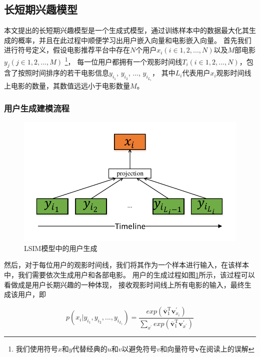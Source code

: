 \subsection{长短期兴趣模型}
本文提出的长短期兴趣模型是一个生成式模型，通过训练样本中的数据最大化其生成的概率，并且在此过程中顺便学习出用户嵌入向量和电影嵌入向量。
首先我们进行符号定义，假设电影推荐平台中存在$N$个用户$x_i(i \in 1,2,...,N)$以及$M$部电影$y_j(j \in 1,2,...,M)$
\footnote{我们使用符号$x$和$y$代替经典的$u$和$v$以避免符号$v$和向量符号$\mathbf{v}$在阅读上的误解}，
每一位用户都拥有一个观影时间线$T_i(i \in 1,2,...,N)$，包含了按照时间排序的若干电影信息$y_{i_1}$, $y_{i_2}$, ..., $y_{i_{L_i}}$，
其中$L_i$代表用户$x_i$观影时间线上电影的数量，其数值远远小于电影数量$M$。

\subsubsection{用户生成建模流程}
\begin{figure}[htbp]
    \centering
    \includegraphics[scale=0.6]{images/doc2vec1.pdf}
    \caption{LSIM模型中的用户生成}
    \label{fig:doc2vec1}
\end{figure}

然后，对于每位用户的观影时间线，我们将其作为一个样本进行输入，在该样本中，我们需要依次生成用户和各部电影。
用户的生成过程如图\ref{fig:doc2vec1}所示，该过程可以看做成是用户长期兴趣的一种体现，
接收观影时间线上所有电影的输入，最终生成该用户，即

\begin{equation}
p(x_i | y_{i_1}, y_{i_2}, ..., y_{i_{L_i}}) =
\frac
{
    exp ( \overline{\mathbf{v}}_{1}^{\mathrm{T}} \mathbf{v}_{x_i}^{'} )
}
{
    \sum_{x^{'}} exp ( \overline{\mathbf{v}}_{1}^{\mathrm{T}} \mathbf{v}_{x^{'}}^{'} )
}
\end{equation}

